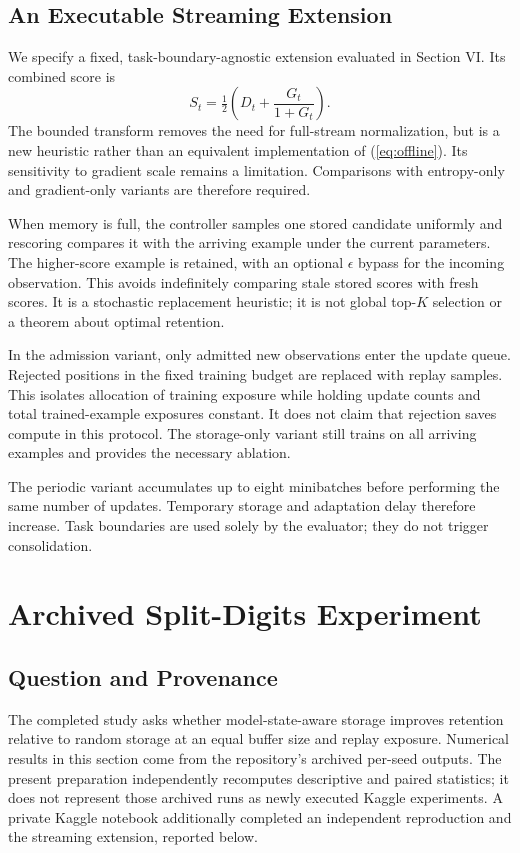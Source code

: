 \documentclass[conference]{IEEEtran}
\begin{document}
\subsection{An Executable Streaming Extension}
We specify a fixed, task-boundary-agnostic extension evaluated in Section VI. Its combined score is
\begin{equation}
 S_t=\tfrac12\left(D_t+\frac{G_t}{1+G_t}\right).
\end{equation}
The bounded transform removes the need for full-stream normalization, but is a new heuristic rather than an equivalent implementation of (\ref{eq:offline}). Its sensitivity to gradient scale remains a limitation. Comparisons with entropy-only and gradient-only variants are therefore required.

When memory is full, the controller samples one stored candidate uniformly and rescoring compares it with the arriving example under the current parameters. The higher-score example is retained, with an optional $\epsilon$ bypass for the incoming observation. This avoids indefinitely comparing stale stored scores with fresh scores. It is a stochastic replacement heuristic; it is not global top-$K$ selection or a theorem about optimal retention.

In the admission variant, only admitted new observations enter the update queue. Rejected positions in the fixed training budget are replaced with replay samples. This isolates allocation of training exposure while holding update counts and total trained-example exposures constant. It does not claim that rejection saves compute in this protocol. The storage-only variant still trains on all arriving examples and provides the necessary ablation.

The periodic variant accumulates up to eight minibatches before performing the same number of updates. Temporary storage and adaptation delay therefore increase. Task boundaries are used solely by the evaluator; they do not trigger consolidation.

\section{Archived Split-Digits Experiment}
\subsection{Question and Provenance}
The completed study asks whether model-state-aware storage improves retention relative to random storage at an equal buffer size and replay exposure. Numerical results in this section come from the repository's archived per-seed outputs. The present preparation independently recomputes descriptive and paired statistics; it does not represent those archived runs as newly executed Kaggle experiments. A private Kaggle notebook additionally completed an independent reproduction and the streaming extension, reported below.
\end{document}
